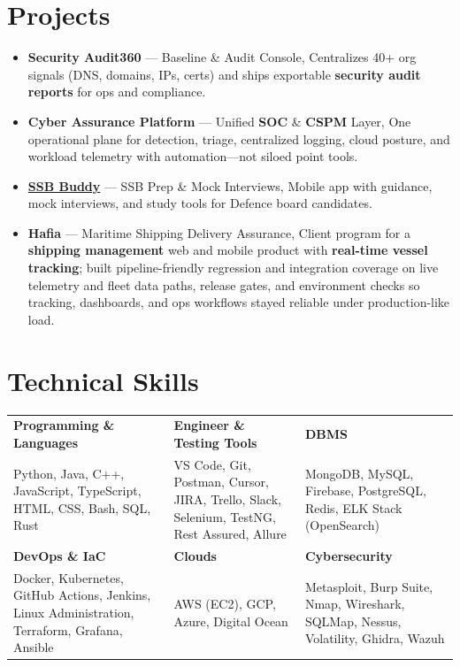 \documentclass[a4paper,10pt]{article}
\newcommand{\resumeProjectHeading}[1]{%
  \item[]
    {\raggedright\small #1\par}\vspace{2pt}%
}
\newcommand{\resumeSubHeadingListStart}{\begin{itemize}[leftmargin=0pt, itemindent=0pt, label={}, labelwidth=0pt, labelsep=0pt]}
\newcommand{\resumeSubHeadingListEnd}{\end{itemize}}
\begin{document}
{\section{Projects}
    \resumeSubHeadingListStart
      \resumeProjectHeading
          {\textbf{Security Audit360} --- Baseline \& Audit Console, Centralizes 40+ org signals (DNS, domains, IPs, certs) and ships exportable \textbf{security audit reports} for ops and compliance.}
      \resumeProjectHeading
          {\textbf{Cyber Assurance Platform} --- Unified \textbf{SOC} \& \textbf{CSPM} Layer, One operational plane for detection, triage, centralized logging, cloud posture, and workload telemetry with automation—not siloed point tools.}
      \resumeProjectHeading
          {\textbf{\href{https://ssb-buddy.neerajlovecyber.com/}{SSB Buddy}} --- SSB Prep \& Mock Interviews, Mobile app with guidance, mock interviews, and study tools for Defence board candidates.}
      \resumeProjectHeading
          {\textbf{Hafia} --- Maritime Shipping Delivery Assurance, Client program for a \textbf{shipping management} web and mobile product with \textbf{real-time vessel tracking}; built pipeline-friendly regression and integration coverage on live telemetry and fleet data paths, release gates, and environment checks so tracking, dashboards, and ops workflows stayed reliable under production-like load.}
    \resumeSubHeadingListEnd

\section{Technical Skills}
{\footnotesize
\setlength{\tabcolsep}{5pt}
\renewcommand{\arraystretch}{1.12}
\begin{tabularx}{\textwidth}{@{}>{\raggedright\arraybackslash}X>{\raggedright\arraybackslash}X>{\raggedright\arraybackslash}X@{}}
\textbf{Programming \& Languages} &
\textbf{Engineer \& Testing Tools} &
\textbf{DBMS} \\[2pt]
Python, Java, C++, JavaScript, TypeScript, HTML, CSS, Bash, SQL, Rust &
VS Code, Git, Postman, Cursor, JIRA, Trello, Slack, Selenium, TestNG, Rest Assured, Allure &
MongoDB, MySQL, Firebase, PostgreSQL, Redis, ELK Stack (OpenSearch) \\[7pt]
\textbf{DevOps \& IaC} &
\textbf{Clouds} &
\textbf{Cybersecurity} \\[2pt]
Docker, Kubernetes, GitHub Actions, Jenkins, Linux Administration, Terraform, Grafana, Ansible &
AWS (EC2), GCP, Azure, Digital Ocean &
Metasploit, Burp Suite, Nmap, Wireshark, SQLMap, Nessus, Volatility, Ghidra, Wazuh \\
\end{tabularx}
\par}

}
\end{document}

